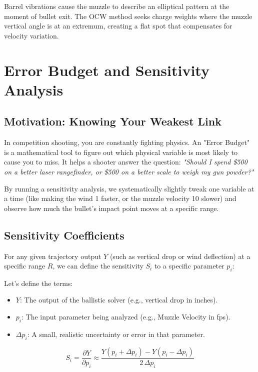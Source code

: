 \documentclass[11pt,twoside,openright]{report}
\begin{document}
Barrel vibrations cause the muzzle to describe an elliptical pattern at the moment of bullet exit. The OCW method seeks charge weights where the muzzle vertical angle is at an extremum, creating a flat spot that compensates for velocity variation.


\chapter{Error Budget and Sensitivity Analysis}
\label{ch:sensitivity}

\section{Motivation: Knowing Your Weakest Link}

In competition shooting, you are constantly fighting physics. An "Error Budget" is a mathematical tool to figure out which physical variable is most likely to cause you to miss. It helps a shooter answer the question: \emph{"Should I spend \$500 on a better laser rangefinder, or \$500 on a better scale to weigh my gun powder?"}

By running a sensitivity analysis, we systematically slightly tweak one variable at a time (like making the wind \SI{1}{\mph} faster, or the muzzle velocity \SI{10}{\fps} slower) and observe how much the bullet's impact point moves at a specific range.

\section{Sensitivity Coefficients}

For any given trajectory output $Y$ (such as vertical drop or wind deflection) at a specific range $R$, we can define the sensitivity $S_i$ to a specific parameter $p_i$:

Let's define the terms:
\begin{itemize}[noitemsep]
    \item $Y$: The output of the ballistic solver (e.g., vertical drop in inches).
    \item $p_i$: The input parameter being analyzed (e.g., Muzzle Velocity in fps).
    \item $\Delta p_i$: A small, realistic uncertainty or error in that parameter.
\end{itemize}

\begin{equation}
  S_i = \frac{\partial Y}{\partial p_i} \approx \frac{Y(p_i + \Delta p_i) - Y(p_i - \Delta p_i)}{2\,\Delta p_i}
  \label{eq:sensitivity}
\end{equation}
\end{document}
